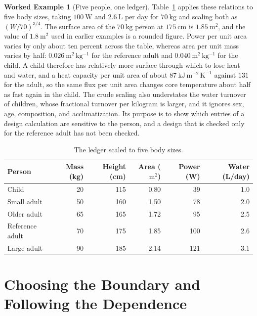\documentclass[11pt,openany]{book}
\theoremstyle{definition}
\newtheorem{example}{Worked Example}[chapter]
\theoremstyle{remark}
\begin{document}
\begin{example}[Five people, one ledger]
\label{ex:variation}
Table~\ref{tab:variation} applies these relations to five body sizes, taking $100\ \mathrm{W}$ and $2.6\ \mathrm{L}$ per day for $70\ \mathrm{kg}$ and scaling both as $(W/70)^{3/4}$. The surface area of the $70\ \mathrm{kg}$ person at $175\ \mathrm{cm}$ is $1.85\ \mathrm{m^{2}}$, and the value of $1.8\ \mathrm{m^{2}}$ used in earlier examples is a rounded figure. Power per unit area varies by only about ten percent across the table, whereas area per unit mass varies by half: $0.026\ \mathrm{m^{2}\,kg^{-1}}$ for the reference adult and $0.040\ \mathrm{m^{2}\,kg^{-1}}$ for the child. A child therefore has relatively more surface through which to lose heat and water, and a heat capacity per unit area of about $87\ \mathrm{kJ\,m^{-2}\,K^{-1}}$ against $131$ for the adult, so the same flux per unit area changes core temperature about half as fast again in the child. The crude scaling also understates the water turnover of children, whose fractional turnover per kilogram is larger, and it ignores sex, age, composition, and acclimatization. Its purpose is to show which entries of a design calculation are sensitive to the person, and a design that is checked only for the reference adult has not been checked.
\end{example}

\begin{table}[ht]
\centering
\caption{The ledger scaled to five body sizes.}
\label{tab:variation}
\begin{tabular}{@{}lrrrrr@{}}
\toprule
Person & Mass (kg) & Height (cm) & Area ($\mathrm{m^{2}}$) & Power (W) & Water (L/day) \\
\midrule
Child & 20 & 115 & 0.80 & 39 & 1.0 \\
Small adult & 50 & 160 & 1.50 & 78 & 2.0 \\
Older adult & 65 & 165 & 1.72 & 95 & 2.5 \\
Reference adult & 70 & 175 & 1.85 & 100 & 2.6 \\
Large adult & 90 & 185 & 2.14 & 121 & 3.1 \\
\bottomrule
\end{tabular}
\end{table}

\section{Choosing the Boundary and Following the Dependence}
\end{document}
